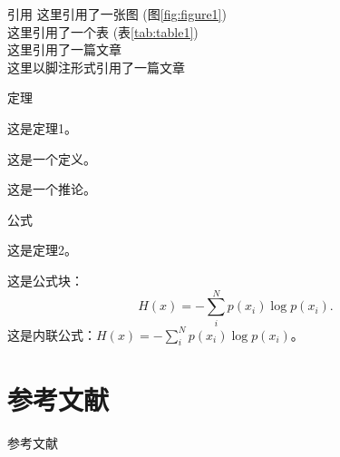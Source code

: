 \documentclass{beamer}
\begin{document}
    \begin{frame}{引用}
        这里引用了一张图 (图\ref{fig:figure1})\\
        这里引用了一个表 (表\ref{tab:table1})\\
        这里引用了一篇文章 \cite{vaswani2017attention}\\
        这里以脚注形式引用了一篇文章 
    \end{frame}
    
    \begin{frame}{定理}
        \begin{theorem}
            这是定理1。
        \end{theorem}
        \begin{definition}
            这是一个定义。
        \end{definition}
        \begin{corollary}
            这是一个推论。
        \end{corollary}
    \end{frame}

    \begin{frame}{公式}
        \begin{theorem}
            这是定理2。
        \end{theorem}
        这是公式块：
        \begin{equation}
            H(x)=-\sum\limits_i^Np(x_i)\log p(x_i).
        \end{equation}
        这是内联公式：$H(x)=-\sum\limits_i^Np(x_i)\log p(x_i)$。
    \end{frame}

    \section{参考文献}

    \begin{frame}[allowframebreaks]{参考文献}
        \printbibliography[heading=none]
    \end{frame}
\end{document}
